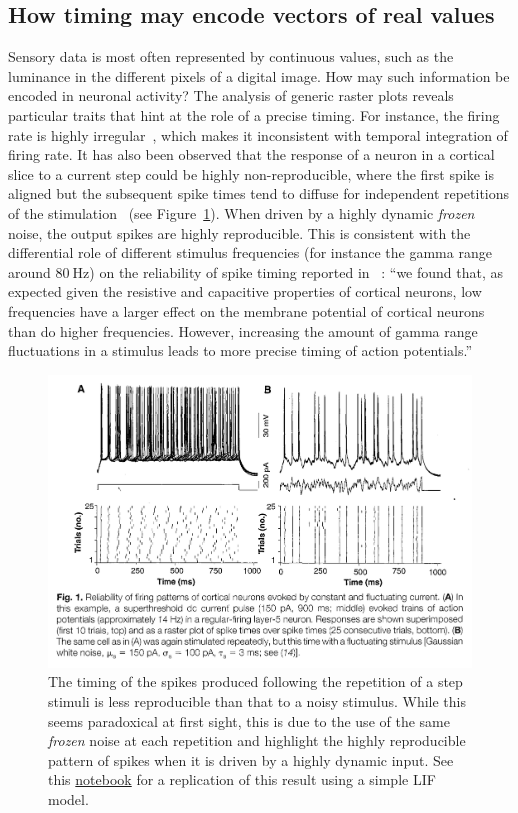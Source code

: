 \documentclass[brainsci, %
               review,submit,pdftex,moreauthors%
               ]{Definitions/mdpi}
\begin{document}
\subsection{How timing may encode vectors of real values}
%
Sensory data is most often represented by continuous values, such as the luminance in the different pixels of a digital image. How may such information be encoded in neuronal activity? The analysis of generic raster plots reveals particular traits that hint at the role of a precise timing. For instance, the firing rate is highly irregular~\citep{softky_highly_1993}, which makes it inconsistent with temporal integration of firing rate. %
It has also been observed that the response of a neuron in a cortical slice to a current step could be highly non-reproducible, where the first spike is aligned but the subsequent spike times tend to diffuse for independent repetitions of the stimulation~\citep{mainen_reliability_1995} (see Figure~\ref{fig:mainen}). When driven by a highly dynamic \emph{frozen} noise, the output spikes are highly reproducible. This is consistent with the differential role of different stimulus frequencies (for instance the gamma range around $80~\si{\Hz}$) on the reliability of spike timing reported in~\citep{nowak_influence_1997} : ``we found that, as expected given the resistive and capacitive properties of cortical neurons, low frequencies have a larger effect on the membrane potential of cortical neurons than do higher frequencies. However, increasing the amount of gamma range fluctuations in a stimulus leads to more precise timing of action potentials.'' 
\begin{figure}
\centering
\includegraphics[width=.7\textwidth]{figures/MainenSejnowski1995.png} %
\caption{The timing of the spikes produced following the repetition of a step stimuli is less reproducible than that to a noisy stimulus. While this seems paradoxical at first sight, this is due to the use of the same \emph{frozen} noise at each repetition and highlight the highly reproducible pattern of spikes when it is driven by a highly dynamic input. See this \href{https://github.com/laurentperrinet/2022_UE-neurosciences-computationnelles/blob/master/C_MainenSejnowski1995.ipynb}{notebook} for a replication of this result using a simple LIF model.}\label{fig:mainen}
\end{figure}
\end{document}
